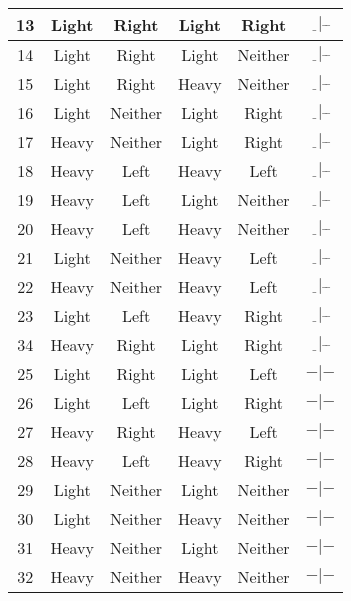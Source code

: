 \begin{table}[H]
\begin{tabular}{|c||c|c||c|c||c|}
      13  &  Light   &  Right    &  Light   &  Right    &  $\underline{~~}|\bar{~}\bar{~}$ \\ \hline
      14  &  Light   &  Right    &  Light   &  Neither  &  $\underline{~~}|\bar{~}\bar{~}$ \\ \hline
      15  &  Light   &  Right    &  Heavy   &  Neither  &  $\underline{~~}|\bar{~}\bar{~}$ \\ \hline
      16  &  Light   &  Neither  &  Light   &  Right    &  $\underline{~~}|\bar{~}\bar{~}$ \\ \hline
      17  &  Heavy   &  Neither  &  Light   &  Right    &  $\underline{~~}|\bar{~}\bar{~}$ \\ \hline
      18  &  Heavy   &  Left     &  Heavy   &  Left     &  $\underline{~~}|\bar{~}\bar{~}$ \\ \hline
      19  &  Heavy   &  Left     &  Light   &  Neither  &  $\underline{~~}|\bar{~}\bar{~}$ \\ \hline
      20  &  Heavy   &  Left     &  Heavy   &  Neither  &  $\underline{~~}|\bar{~}\bar{~}$ \\ \hline
      21  &  Light   &  Neither  &  Heavy   &  Left     &  $\underline{~~}|\bar{~}\bar{~}$ \\ \hline
      22  &  Heavy   &  Neither  &  Heavy   &  Left     &  $\underline{~~}|\bar{~}\bar{~}$ \\ \hline
      23  &  Light   &  Left     &  Heavy   &  Right    &  $\underline{~~}|\bar{~}\bar{~}$ \\ \hline
      34  &  Heavy   &  Right    &  Light   &  Right    &  $\underline{~~}|\bar{~}\bar{~}$ \\ \hline\hline

      25  &  Light   &  Right    &  Light   &  Left     &  $-|-$ \\ \hline
      26  &  Light   &  Left     &  Light   &  Right    &  $-|-$ \\ \hline
      27  &  Heavy   &  Right    &  Heavy   &  Left     &  $-|-$ \\ \hline
      28  &  Heavy   &  Left     &  Heavy   &  Right    &  $-|-$ \\ \hline
      29  &  Light   &  Neither  &  Light   &  Neither  &  $-|-$ \\ \hline
      30  &  Light   &  Neither  &  Heavy   &  Neither  &  $-|-$ \\ \hline
      31  &  Heavy   &  Neither  &  Light   &  Neither  &  $-|-$ \\ \hline
      32  &  Heavy   &  Neither  &  Heavy   &  Neither  &  $-|-$ \\ \hline\hline


\end{tabular}
\end{table}

